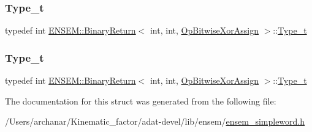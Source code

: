 \mbox{\label{structENSEM_1_1BinaryReturn_3_01int_00_01int_00_01OpBitwiseXorAssign_01_4_a8ee67fcadda1141739b4054917e9e3d2}} 
\subsubsection{\texorpdfstring{Type\_t}{Type\_t}\hspace{0.1cm}{\footnotesize\ttfamily [2/3]}}
{\footnotesize\ttfamily typedef int \mbox{\hyperlink{structENSEM_1_1BinaryReturn}{E\+N\+S\+E\+M\+::\+Binary\+Return}}$<$ int, int, \mbox{\hyperlink{structENSEM_1_1OpBitwiseXorAssign}{Op\+Bitwise\+Xor\+Assign}} $>$\+::\mbox{\hyperlink{structENSEM_1_1BinaryReturn_3_01int_00_01int_00_01OpBitwiseXorAssign_01_4_a8ee67fcadda1141739b4054917e9e3d2}{Type\+\_\+t}}}

\mbox{\label{structENSEM_1_1BinaryReturn_3_01int_00_01int_00_01OpBitwiseXorAssign_01_4_a8ee67fcadda1141739b4054917e9e3d2}} 
\subsubsection{\texorpdfstring{Type\_t}{Type\_t}\hspace{0.1cm}{\footnotesize\ttfamily [3/3]}}
{\footnotesize\ttfamily typedef int \mbox{\hyperlink{structENSEM_1_1BinaryReturn}{E\+N\+S\+E\+M\+::\+Binary\+Return}}$<$ int, int, \mbox{\hyperlink{structENSEM_1_1OpBitwiseXorAssign}{Op\+Bitwise\+Xor\+Assign}} $>$\+::\mbox{\hyperlink{structENSEM_1_1BinaryReturn_3_01int_00_01int_00_01OpBitwiseXorAssign_01_4_a8ee67fcadda1141739b4054917e9e3d2}{Type\+\_\+t}}}



The documentation for this struct was generated from the following file\+:\begin{DoxyCompactItemize}
\item 
/\+Users/archanar/\+Kinematic\+\_\+factor/adat-\/devel/lib/ensem/\mbox{\hyperlink{adat-devel_2lib_2ensem_2ensem__simpleword_8h}{ensem\+\_\+simpleword.\+h}}\end{DoxyCompactItemize}
